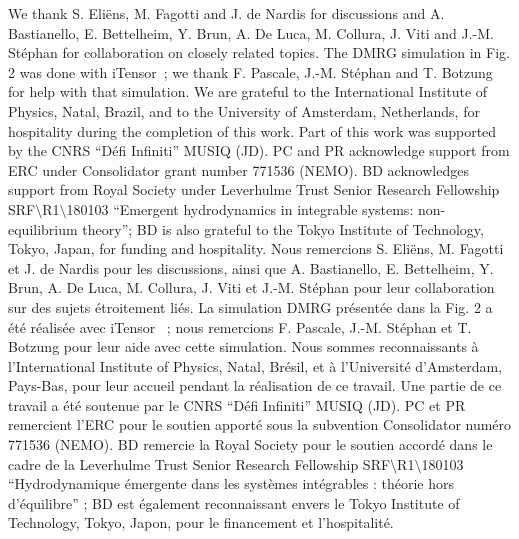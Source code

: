\documentclass[twocolumn,amsfonts,showpacs,superscriptaddress]{revtex4-1}
\newcommand{\trad}[1]{\textcolor{myblue}{#1}}
\begin{document}
 
\vspace{0.1cm}
\begin{acknowledgments}
We thank S. Eli\"ens, M. Fagotti and J. de Nardis for discussions and A. Bastianello, E. Bettelheim, Y. Brun, A. De Luca, M. Collura, J. Viti and J.-M. St\'ephan for  collaboration on closely related topics. The DMRG simulation in Fig. 2 was done with iTensor~\cite{itensor}; we thank F. Pascale, J.-M. St\' ephan and T. Botzung for help with that simulation. We are grateful to the International Institute of Physics, Natal, Brazil, and to the University of Amsterdam, Netherlands, for hospitality during the completion of this work. Part of this work was supported by the CNRS ``D\'efi Infiniti'' MUSIQ (JD). PC and PR acknowledge support from ERC under Consolidator grant number 771536 (NEMO). BD acknowledges support from Royal Society under Leverhulme Trust Senior Research Fellowship SRF$\setminus$R1$\setminus$180103 ``Emergent hydrodynamics in integrable systems: non-equilibrium theory''; BD is also grateful to the Tokyo Institute of Technology, Tokyo, Japan, for funding and hospitality.
\trad{
Nous remercions S. Eli\"ens, M. Fagotti et J. de Nardis pour les discussions, ainsi que A. Bastianello, E. Bettelheim, Y. Brun, A. De Luca, M. Collura, J. Viti et J.-M. St\'ephan pour leur collaboration sur des sujets étroitement liés. La simulation DMRG présentée dans la Fig. 2 a été réalisée avec iTensor~\cite{itensor} ; nous remercions F. Pascale, J.-M. St\'ephan et T. Botzung pour leur aide avec cette simulation. Nous sommes reconnaissants à l'International Institute of Physics, Natal, Brésil, et à l'Université d'Amsterdam, Pays-Bas, pour leur accueil pendant la réalisation de ce travail. Une partie de ce travail a été soutenue par le CNRS ``Défi Infiniti'' MUSIQ (JD). PC et PR remercient l'ERC pour le soutien apporté sous la subvention Consolidator numéro 771536 (NEMO). BD remercie la Royal Society pour le soutien accordé dans le cadre de la Leverhulme Trust Senior Research Fellowship SRF$\setminus$R1$\setminus$180103 ``Hydrodynamique émergente dans les systèmes intégrables : théorie hors d'équilibre'' ; BD est également reconnaissant envers le Tokyo Institute of Technology, Tokyo, Japon, pour le financement et l'hospitalité.
}
\end{acknowledgments}








\newpage
\end{document}
